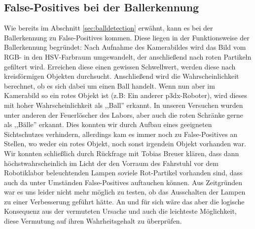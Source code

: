 
\subsection{False-Positives bei der Ballerkennung}
\label{sec:false-positives-bei}
Wie bereits im Abschnitt \ref{sec:balldetection} erwähnt, kann es bei
der Ballerkennung zu False-Positives kommen. Diese liegen in der
Funktionsweise der Ballerkennung begründet: Nach Aufnahme des
Kamerabildes wird das Bild vom RGB- in den HSV-Farbraum umgewandelt,
der anschließend nach roten Partikeln gefiltert wird. Erreichen diese
einen gewissen Schwellwert, werden diese nach kreisförmigen Objekten
durchsucht. Anschließend wird die Wahrscheinlichkeit berechnet, ob es
sich dabei um einen Ball handelt. Wenn nun aber im Kamerabild so ein
rotes Objekt ist (z.B: Ein anderer p3dx-Roboter), wird dieses mit
hoher Wahrscheinlichkeit als ,,Ball'' erkannt. In unseren Versuchen
wurden unter anderen der Feuerlöscher des Labors, aber auch die roten
Schränke gerne als ,,Bälle'' erkannt. Dies konnten wir durch Aufbau
eines geeigneten Sichtschutzes verhindern, allerdings kam es immer
noch zu False-Positives an Stellen, wo weder ein rotes Objekt, noch
sonst irgendein Objekt vorhanden war. Wir konnten schließlich durch
Rückfrage mit Tobias Breuer klären, dass dann höchstwahrscheinlich im
Licht der den Vorraum des Fahrstuhl vor dem Robotiklabor beleuchtenden
Lampen soviele Rot-Partikel vorhanden sind, dass auch da unter
Umständen False-Positives auftauchen können. Aus Zeitgründen war es
uns leider nicht mehr möglich zu testen, ob das Ausschalten der Lampen
zu einer Verbesserung geführt hätte. An und für sich wäre das aber die
logische Konsequenz aus der vermuteten Ursache und auch die leichteste
Möglichkeit, diese Vermutung auf ihren Wahrheitsgehalt zu überprüfen.

